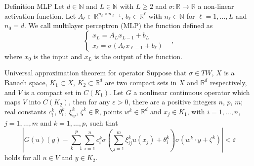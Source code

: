 \documentclass{beamer}
\newcommand{\numberset}{\mathbb}
\newcommand{\N}{\numberset{N}}
\newcommand{\R}{\numberset{R}}
\begin{document}

\begin{frame}[noframenumbering]{Definition MLP}
	Let $ d \in \N $ and $ L\in \N $ with $ L \ge 2 $ and $ \sigma : \R \to \R  $ a non-linear activation function. Let $ A_{\ell} \in \R^{n_{\ell}\times n_{\ell-1}} $, $ b_{\ell} \in \R^{\ell} $ with $ n_{\ell}\in \N $ for $ \ell = 1, \dots, L $	and $ n_{0} = d $. We call multilayer perceptron (MLP) the function defined as
	\[ \begin{cases}
			x_{L} = A_{L}x_{L-1} + b_{L} \qquad & \\
			x_{\ell} = \sigma\left( A_{\ell}x_{\ell-1} + b_{\ell} \right)
		\end{cases}, \]
	where $ x_0 $ is the input and $ x_{L} $ is the output of the function.
\end{frame}


\begin{frame}[noframenumbering]{Universal approximation theorem for operator}
	Suppose that $ \sigma \in TW $, $ X $ is a Banach space, $ K_1 \subset X $, $ K_2 \subset \R^d $ are two compact sets in $ X $ and $ \R^{d} $ respectively, and $ V $ is a compact set in $ C(K_1) $. Let $ G $ a nonlinear continuous operator which maps $ V $ into $ C(K_2) $, then for any $ \varepsilon > 0 $, there are a positive integers $ n $, $ p $, $ m $; real constants $ c_i^{k}$, $ \theta_i^{k}$, $ \xi_{ij}^{k} $, $ \zeta^k \in \R $, points $ w^{k} \in \R^d $ and $ x_j \in K_1 $, with $ i = 1, \dots, n$, $ j = 1, \dots, m $ and $ k = 1, \dots, p $, such that
	\[ \left| G(u)(y) - \sum_{k=1}^{p}\sum_{i=1}^{n}c_i^k \sigma \left( \sum_{j=1}^{m} \xi_{ij}^k u(x_j) + \theta_i^k \right) \sigma(w^k \cdot y + \zeta^k) \right| < \varepsilon  \]
	holds for all $ u \in V $ and $ y \in K_2 $.
\end{frame}
\end{document}

